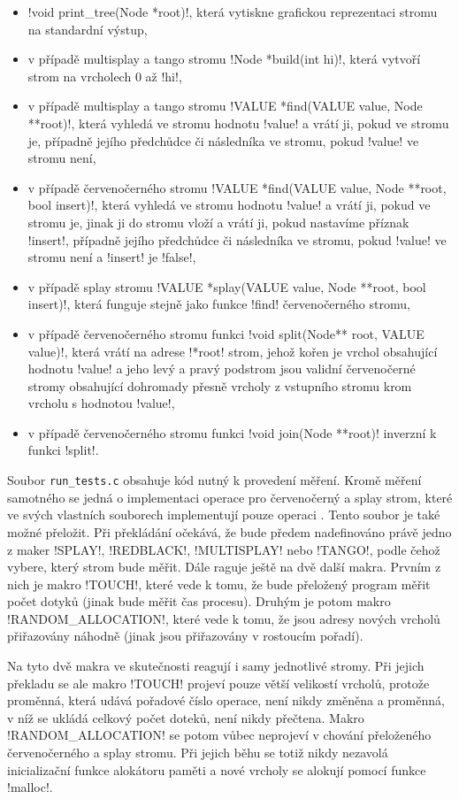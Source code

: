 \begin{itemize}
\item !void print_tree(Node *root)!, která vytiskne grafickou reprezentaci stromu na standardní výstup,
\item v případě multisplay a tango stromu !Node *build(int hi)!, která vytvoří strom na vrcholech 0 až !hi!,
\item v případě multisplay a tango stromu !VALUE *find(VALUE value, Node **root)!, která vyhledá ve stromu hodnotu !value! a vrátí ji, pokud ve stromu je, případně jejího předchůdce či následníka ve stromu, pokud !value! ve stromu není,
\item v případě červenočerného stromu !VALUE *find(VALUE value, Node **root, bool insert)!, která vyhledá ve stromu hodnotu !value! a vrátí ji, pokud ve stromu je, jinak ji do stromu vloží a vrátí ji, pokud nastavíme příznak !insert!, případně jejího předchůdce či následníka ve stromu, pokud !value! ve stromu není a !insert! je !false!,
\item v případě splay stromu !VALUE *splay(VALUE value, Node **root, bool insert)!, která funguje stejně jako funkce !find! červenočerného stromu,
\item v případě červenočerného stromu funkci !void split(Node** root, VALUE value)!, která vrátí na adrese !*root! strom, jehož kořen je vrchol obsahující hodnotu !value! a jeho levý a pravý podstrom jsou validní červenočerné stromy obsahující dohromady přesně vrcholy z vstupního stromu krom vrcholu s hodnotou !value!,
\item v případě červenočerného stromu funkci !void join(Node **root)! inverzní k funkci !split!.
\end{itemize}

Soubor {\tt run_tests.c} obsahuje kód nutný k provedení měření. Kromě měření
samotného se jedná o implementaci operace  pro červenočerný a splay
strom, které ve svých vlastních souborech implementují pouze operaci
. Tento soubor je také možné přeložit. Při překládání očekává, že
bude předem nadefinováno právě jedno z maker !SPLAY!, !REDBLACK!, !MULTISPLAY!
nebo !TANGO!, podle čehož vybere, který strom bude měřit. Dále raguje ještě na
dvě další makra. Prvním z nich je makro !TOUCH!, které vede k tomu, že bude
přeložený program měřit počet dotyků (jinak bude měřit čas procesu). Druhým je
potom makro !RANDOM_ALLOCATION!, které vede k tomu, že jsou adresy nových
vrcholů přiřazovány náhodně (jinak jsou přiřazovány v rostoucím pořadí).

Na tyto dvě makra ve skutečnosti reagují i samy jednotlivé stromy. Při jejich
překladu se ale makro !TOUCH! projeví pouze větší velikostí vrcholů, protože
proměnná, která udává pořadové číslo operace, není nikdy změněna a proměnná, v
níž se ukládá celkový počet doteků, není nikdy přečtena. Makro
!RANDOM_ALLOCATION! se potom vůbec neprojeví v chování přeloženého
červenočerného a splay stromu. Při jejich běhu se totiž nikdy nezavolá
inicializační funkce alokátoru paměti a nové vrcholy se alokují pomocí funkce
!malloc!.

